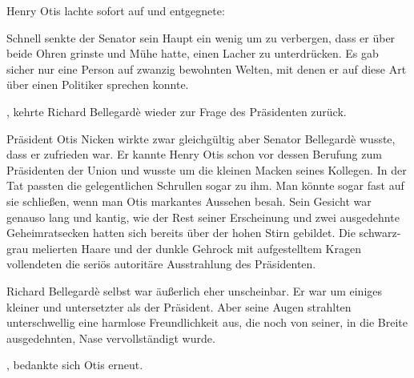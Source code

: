 Henry Otis lachte sofort auf und entgegnete: 

\par

Schnell senkte der Senator sein Haupt ein wenig um zu verbergen, dass er über beide Ohren grinste und Mühe hatte, einen Lacher zu unterdrücken. Es gab sicher nur eine Person auf zwanzig bewohnten Welten, mit denen er auf diese Art über einen Politiker sprechen konnte.

\par

, kehrte Richard Bellegardè wieder zur Frage des Präsidenten zurück. 

\par

Präsident Otis Nicken wirkte zwar gleichgültig aber Senator Bellegardè wusste, dass er zufrieden war. Er kannte Henry Otis schon vor dessen Berufung zum Präsidenten der Union und wusste um die kleinen Macken seines Kollegen. In der Tat passten die gelegentlichen Schrullen sogar zu ihm. Man könnte sogar fast auf sie schließen, wenn man Otis markantes Aussehen besah. Sein Gesicht war genauso lang und kantig, wie der Rest seiner Erscheinung und zwei ausgedehnte Geheimratsecken hatten sich bereits über der hohen Stirn gebildet. Die schwarz-grau melierten Haare und der dunkle Gehrock mit aufgestelltem Kragen vollendeten die seriös autoritäre Ausstrahlung des Präsidenten.

\par

Richard Bellegardè selbst war äußerlich eher unscheinbar. Er war um einiges kleiner und untersetzter als der Präsident. Aber seine Augen strahlten unterschwellig eine harmlose Freundlichkeit aus, die noch von seiner, in die Breite ausgedehnten, Nase vervollständigt wurde.

\par

, bedankte sich Otis erneut.

\par

